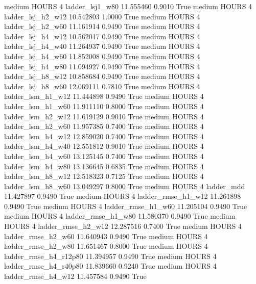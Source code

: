     medium    HOURS                 4        ladder_lsj1_w80  11.555460      0.9010    True
    medium    HOURS                 4      ladder_lsj_h2_w12  10.542803      1.0000    True
    medium    HOURS                 4      ladder_lsj_h2_w60  11.161914      0.9490    True
    medium    HOURS                 4      ladder_lsj_h4_w12  10.562017      0.9490    True
    medium    HOURS                 4      ladder_lsj_h4_w40  11.264937      0.9490    True
    medium    HOURS                 4      ladder_lsj_h4_w60  11.852008      0.9490    True
    medium    HOURS                 4      ladder_lsj_h4_w80  11.094927      0.9490    True
    medium    HOURS                 4      ladder_lsj_h8_w12  10.858684      0.9490    True
    medium    HOURS                 4      ladder_lsj_h8_w60  12.069111      0.7810    True
    medium    HOURS                 4      ladder_lsm_h1_w12  11.444898      0.9490    True
    medium    HOURS                 4      ladder_lsm_h1_w60  11.911110      0.8000    True
    medium    HOURS                 4      ladder_lsm_h2_w12  11.619129      0.9010    True
    medium    HOURS                 4      ladder_lsm_h2_w60  11.957385      0.7400    True
    medium    HOURS                 4      ladder_lsm_h4_w12  12.859020      0.7400    True
    medium    HOURS                 4      ladder_lsm_h4_w40  12.551812      0.9010    True
    medium    HOURS                 4      ladder_lsm_h4_w60  13.125145      0.7400    True
    medium    HOURS                 4      ladder_lsm_h4_w80  13.136645      0.6835    True
    medium    HOURS                 4      ladder_lsm_h8_w12  12.518323      0.7125    True
    medium    HOURS                 4      ladder_lsm_h8_w60  13.049297      0.8000    True
    medium    HOURS                 4             ladder_mdd  11.427897      0.9490    True
    medium    HOURS                 4     ladder_rmse_h1_w12  11.261898      0.9490    True
    medium    HOURS                 4     ladder_rmse_h1_w60  11.205104      0.9490    True
    medium    HOURS                 4     ladder_rmse_h1_w80  11.580370      0.9490    True
    medium    HOURS                 4     ladder_rmse_h2_w12  12.287516      0.7400    True
    medium    HOURS                 4     ladder_rmse_h2_w60  11.640943      0.9490    True
    medium    HOURS                 4     ladder_rmse_h2_w80  11.651467      0.8000    True
    medium    HOURS                 4  ladder_rmse_h4_r12p80  11.394957      0.9490    True
    medium    HOURS                 4  ladder_rmse_h4_r40p80  11.839660      0.9240    True
    medium    HOURS                 4     ladder_rmse_h4_w12  11.457584      0.9490    True
